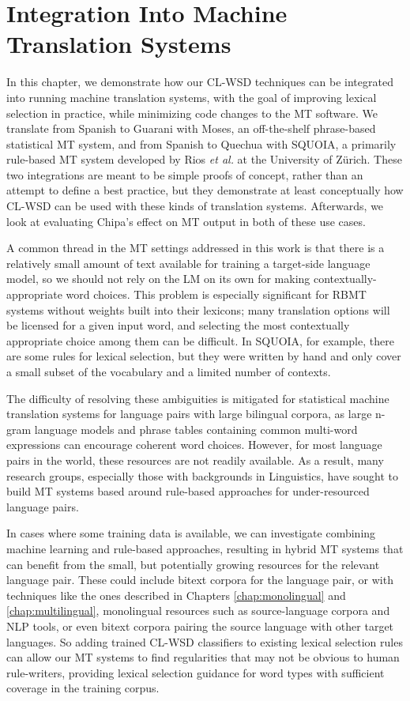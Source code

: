 \chapter{Integration Into Machine Translation Systems}
\label{chap:integration}
In this chapter, we demonstrate how our CL-WSD techniques can be integrated
into running machine translation systems, with the goal of improving lexical
selection in practice, while minimizing code changes to the MT software. We
translate from Spanish to Guarani with Moses\cite{koehn-EtAl:2007:PosterDemo},
an off-the-shelf phrase-based statistical MT system, and from Spanish to
Quechua with SQUOIA\cite{rios2015basic}, a primarily rule-based MT system
developed by Rios \emph{et al.} at the University of Zürich. These two
integrations are meant to be simple proofs of concept, rather than an attempt
to define a best practice, but they demonstrate at least conceptually how
CL-WSD can be used with these kinds of translation systems. Afterwards, we look
at evaluating Chipa's effect on MT output in both of these use cases.

A common thread in the MT settings addressed in this work is that there is a
relatively small amount of text available for training a target-side language
model, so we should not rely on the LM on its own for making
contextually-appropriate word choices. This problem is especially significant
for RBMT systems without weights built into their lexicons; many translation
options will be licensed for a given input word, and selecting the most
contextually appropriate choice among them can be difficult. In SQUOIA, for
example, there are some rules for lexical selection, but they were written by
hand and only cover a small subset of the vocabulary and a limited number of
contexts.

The difficulty of resolving these ambiguities is mitigated for statistical
machine translation systems for language pairs with large bilingual corpora, as
large n-gram language models and phrase tables containing common multi-word
expressions can encourage coherent word choices. However, for most language
pairs in the world, these resources are not readily available. As a result,
many research groups, especially those with backgrounds in Linguistics, have
sought to build MT systems based around rule-based approaches for
under-resourced language pairs.

In cases where some training data is available, we can investigate combining
machine learning and rule-based approaches, resulting in hybrid MT systems that
can benefit from the small, but potentially growing resources for the relevant
language pair. These could include bitext corpora for the language pair, or
with techniques like the ones described in Chapters \ref{chap:monolingual} and
\ref{chap:multilingual}, monolingual resources such as source-language corpora
and NLP tools, or even bitext corpora pairing the source language with other
target languages. So adding trained CL-WSD classifiers to existing lexical
selection rules can allow our MT systems to find regularities that may not be
obvious to human rule-writers, providing lexical selection guidance for word
types with sufficient coverage in the training corpus.


